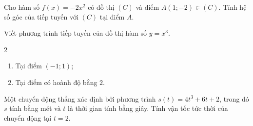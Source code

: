 \begin{bt}%

	Cho hàm số $f(x)=-2 x^2$ có đồ thị $(C)$ và điểm $A(1 ;-2) \in(C)$. Tính hệ số góc của tiếp tuyến với $(C)$ tại điểm $A$.
\end{bt}

\begin{bt}%

	Viết phương trình tiếp tuyến của đồ thị hàm số $y=x^3$.
	\begin{multicols}{2}
	\begin{enumerate}
		\item Tại điểm $(-1 ; 1)$;
		\item Tại điểm có hoành độ bằng $2$.
	\end{enumerate}
	\end{multicols}	
\end{bt}

\begin{bt}%

	Một chuyển động thẳng xác định bởi phương trình $s(t)=4 t^3+6 t+2$, trong đó $s$ tính bằng mét và $t$ là thời gian tính bằng giây. Tính vận tốc tức thời của chuyển động tại $t=2$.
\end{bt}

